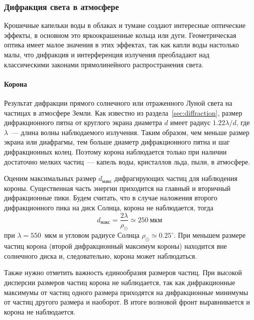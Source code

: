 \subsubsection{Дифракция света в атмосфере}
\label{sec:atmospheric-diffraction}

Крошечные капельки воды в облаках и тумане создают интересные оптические эффекты,  в основном это яркоокрашенные кольца или дуги. Геометрическая оптика имеет малое значения в этих эффектах, так как капли воды настолько малы, что дифракция и интерференция излучения преобладают над классическими законами прямолинейного распространения света.

\paragraph{Корона}
Результат дифракции прямого солнечного или отраженного Луной света на частицах в атмосфере Земли. Как известно из раздела~\ref{sec:diffraction}, размер дифракционного пятна от круглого экрана диаметра $d$ имеет радиус $1.22 \lambda / d$, где $\lambda$~--- длина волны наблюдаемого излучения. Таким образом, чем меньше размер экрана или диафрагмы, тем больше диаметр дифракционного пятна и шаг дифракционных колец. Поэтому корона наблюдается только при наличии достаточно мелких частиц~--- капель воды, кристаллов льда, пыли, в атмосфере.

Оценим максимальных размер $d_\text{макс}$ дифрагирующих частиц для наблюдения короны. Существенная часть энергии приходится на главный и вторичный дифракционные пики. Будем считать, что в случае наложения второго дифракционного пика на диск Солнца, корона не наблюдается, тогда
\begin{equation*}
    d_\text{макс} = \frac{2\lambda}{\rho_\odot} \simeq 250~\text{мкм}
\end{equation*}
при $\lambda = 550$~мкм и угловом радиусе Солнца $\rho_\odot \simeq 0.25^\circ$. При меньшем размере частиц корона (второй дифракционный максимум короны) находится вне солнечного диска и, следовательно, корона может наблюдаться. 

Также нужно отметить важность единообразия размеров частиц. При высокой дисперсии размеров частиц корона не наблюдается, так как дифракционные максимумы от частиц одного размера приходятся на дифракционные минимумы от частиц другого размера и наоборот. В итоге волновой фронт выравнивается и корона не наблюдается.~\cite{Les_Cowley_2005}


